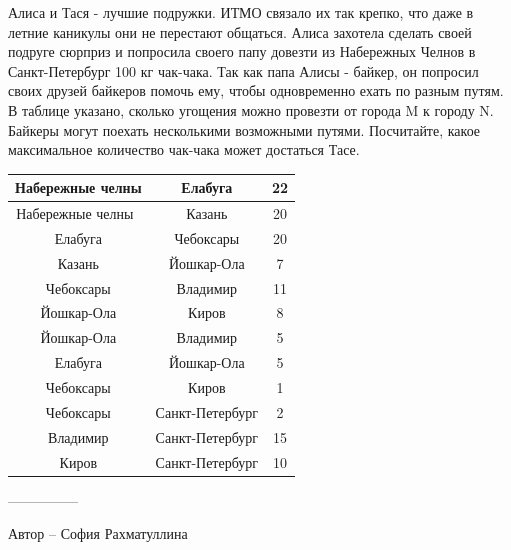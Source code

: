 \question
Алиса и Тася - лучшие подружки. ИТМО связало их так крепко, что даже в летние каникулы они не перестают общаться. Алиса захотела сделать своей подруге сюрприз и попросила своего папу довезти из Набережных Челнов в Санкт-Петербург 100 кг чак-чака. Так как папа Алисы - байкер, он попросил своих друзей байкеров помочь ему, чтобы одновременно ехать по разным путям. В таблице указано, сколько угощения можно провезти от города M к городу N. Байкеры могут поехать несколькими возможными путями. Посчитайте, какое максимальное количество чак-чака может достаться Тасе.

\begin{center}
\begin{tabular}{| c | c | c |}
\hline
Набережные челны & Елабуга & 22\\
\hline
Набережные челны  & Казань & 20\\
\hline
Елабуга & Чебоксары & 20\\
\hline
Казань & Йошкар-Ола & 7\\
\hline
Чебоксары & Владимир & 11\\
\hline
Йошкар-Ола & Киров & 8\\
\hline
Йошкар-Ола & Владимир & 5\\
\hline
Елабуга & Йошкар-Ола & 5\\
\hline
 Чебоксары & Киров&1\\\hline
 Чебоксары & Санкт-Петербург &2\\\hline
 Владимир & Санкт-Петербург &15\\\hline
 Киров & Санкт-Петербург &10\\\hline

\end{tabular}
\end{center}

---------------

Автор -- София Рахматуллина